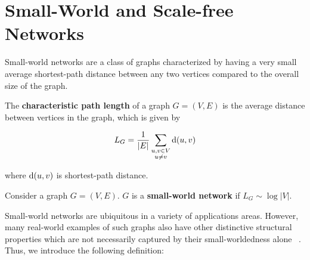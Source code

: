 






\section{Small-World and Scale-free Networks}
\label{sec:small_world}

Small-world networks are a class of graphs characterized by having a very small
average shortest-path distance between any two vertices compared to the overall
size of the graph.


\begin{definition}
  The \textbf{characteristic path length} of a graph $G = (V,E)$ is the average
  distance between vertices in the graph, which is given by

  \[ L_G = \frac{1}{|E|} \sum_{\substack{u,v \in V \\ u \neq v}} \mathrm{d}(u,v)\]

  where $\mathrm{d}(u,v)$ is shortest-path distance. 
\end{definition}

\begin{definition}
  Consider a graph $G = (V,E)$. $G$ is a \textbf{small-world network} if
  $L_G \sim \log{|V|}$.
\end{definition}

Small-world networks are ubiquitous in a variety of applications areas. However, many real-world
examples of such graphs also have other distinctive structural properties which are not necessarily
captured by their small-worldedness alone ~\cite{Barabasi509}. Thus, we introduce the following
definition:





